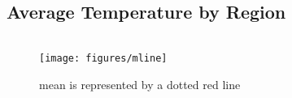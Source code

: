 \documentclass[
]{book}
\begin{document}
\hypertarget{average-temperature-by-region}{%
\subsection{Average Temperature by Region}\label{average-temperature-by-region}}

\begin{columns-nocenter}

\begin{column}

\begin{figure}
\texttt{[image: figures/mline]} \caption{mean is represented by a dotted red line}\label{fig:unnamed-chunk-13}
\end{figure}

\end{column}

\begin{column}

\end{column}

\begin{column}

\end{column}

\end{columns-nocenter}
\end{document}
